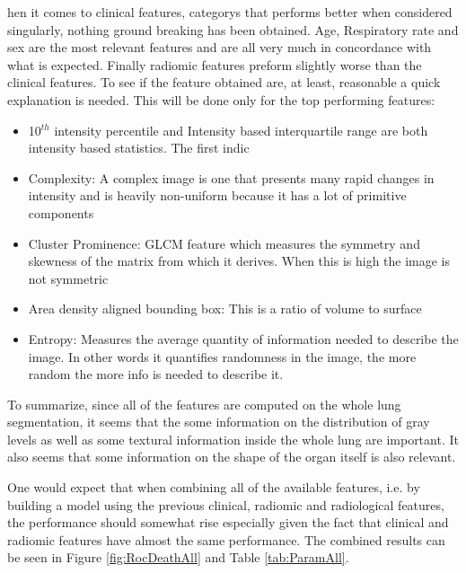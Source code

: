  hen it comes to clinical features, categorys that performs better when considered singularly, nothing ground breaking has been obtained.
Age, Respiratory rate and sex are the most relevant features and are all very much in concordance with what is expected. Finally radiomic features preform slightly worse than the clinical features. To see if the feature obtained are, at least, reasonable a quick explanation is needed. 
This will be done only for the top performing features:

\begin{itemize}
\item 10$^{th}$ intensity percentile and Intensity based interquartile range are both intensity based statistics. The first indic
\item Complexity: A complex image is one that presents many rapid changes in intensity and is heavily non-uniform because it has a lot of primitive components 
\item Cluster Prominence: GLCM feature which measures the symmetry and skewness of the matrix from which it derives. When this is high the image is not symmetric
\item Area density aligned bounding box: This is a ratio of volume to surface
\item Entropy: Measures the average quantity of information needed to describe the image. In other words it quantifies randomness in the image, the more random the more info is needed to describe it.
\end{itemize}

To summarize, since all of the features are computed on the whole lung segmentation, it seems that the some information on the distribution of gray levels as well as some textural information inside the whole lung are important.
It also seems that some information on the shape of the organ itself is also relevant.

One would expect that when combining all of the available features, i.e. by building a model using the previous clinical, radiomic and radiological features, the performance should somewhat rise especially given the fact that clinical and radiomic features have almost the same performance. The combined results can be seen in Figure \ref{fig:RocDeathAll} and Table \ref{tab:ParamAll}.

